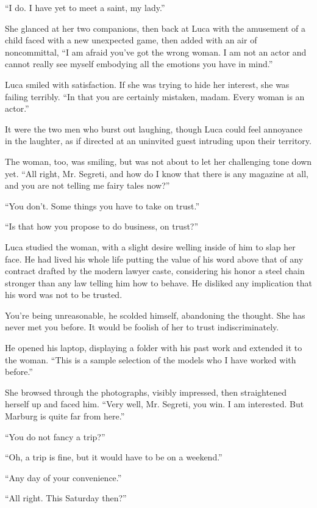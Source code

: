 ``I do. I have yet to meet a saint, my lady.''

She glanced at her two companions, then back at Luca with the amusement of a child faced with a new unexpected game, then added with an air of noncommittal, ``I am afraid you've got the wrong woman. I am not an actor and cannot really see myself embodying all the emotions you have in mind.''

Luca smiled with satisfaction. If she was trying to hide her interest, she was failing terribly. ``In that you are certainly mistaken, madam. Every woman is an actor.''

It were the two men who burst out laughing, though Luca could feel annoyance in the laughter, as if directed at an uninvited guest intruding upon their territory.

The woman, too, was smiling, but was not about to let her challenging tone down yet. ``All right, Mr. Segreti, and how do I know that there is any magazine at all, and you are not telling me fairy tales now?''

``You don't. Some things you have to take on trust.''

``Is that how you propose to do business, on trust?''

Luca studied the woman, with a slight desire welling inside of him to slap her face. He had lived his whole life putting the value of his word above that of any contract drafted by the modern lawyer caste, considering his honor a steel chain stronger than any law telling him how to behave. He disliked any implication that his word was not to be trusted.

You're being unreasonable, he scolded himself, abandoning the thought. She has never met you before. It would be foolish of her to trust indiscriminately.

He opened his laptop, displaying a folder with his past work and extended it to the woman. ``This is a sample selection of the models who I have worked with before.''

She browsed through the photographs, visibly impressed, then straightened herself up and faced him. ``Very well, Mr. Segreti, you win. I am interested. But Marburg is quite far from here.''

``You do not fancy a trip?''

``Oh, a trip is fine, but it would have to be on a weekend.''

``Any day of your convenience.''

``All right. This Saturday then?''

